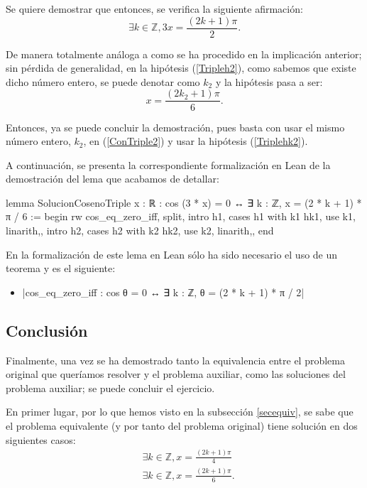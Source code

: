 \begin{demostracion}
  Se quiere demostrar que entonces, se verifica la siguiente
  afirmación:
  \begin{equation}\label{ConTriple2}
    ∃k∈ ℤ,3x=\frac{(2k+1)π}{2}.
  \end{equation}

  De manera totalmente análoga a como se ha procedido en la
  implicación anterior; sin pérdida de generalidad, en la
  hipótesis (\ref{Tripleh2}), como sabemos que existe dicho número
  entero, se puede denotar como \(k_2\) y la hipótesis pasa a ser:
  \begin{equation}\label{Triplehk2}\tag{hk2}
     x=\frac{(2k_2+1)π}{6}.
   \end{equation}

   Entonces, ya se puede concluir la demostración, pues basta con
   usar el mismo número entero, \(k_2\), en (\ref{ConTriple2}) y
   usar la hipótesis (\ref{Triplehk2}).
\end{demostracion}

A continuación, se presenta la correspondiente formalización
en Lean de la demostración del lema que acabamos de detallar:
\begin{leancode}
lemma SolucionCosenoTriple {x : ℝ} : cos (3 * x) = 0 ↔ 
∃ k : ℤ, x = (2 * k + 1) * π / 6 :=
begin
  rw cos_eq_zero_iff,
  split,
  {intro h1,
  cases h1 with k1 hk1,
  use k1,
  linarith,},
  {intro h2,
  cases h2 with k2 hk2,
  use k2,
  linarith,},
end
\end{leancode}

En la formalización de este lema en Lean sólo ha sido necesario
el uso de un teorema y es el siguiente:
\begin{itemize}
\item {}|cos_eq_zero_iff :  cos θ = 0 ↔ ∃ k : ℤ, θ = (2 * k + 1) * π / 2|
\end{itemize} 

\subsection{Conclusión}
Finalmente, una vez se ha demostrado tanto la equivalencia entre el
problema original que queríamos resolver y el problema auxiliar,
como las soluciones del problema auxiliar; se puede concluir el
ejercicio.

En primer lugar, por lo que hemos visto en la subsección
\ref{secequiv}, se sabe que el problema equivalente
(y por tanto del problema original) tiene solución en dos
siguientes casos:
\begin{align}
  &∃k∈ℤ, x=\frac{(2k+1)π}{4}\label{condicion1}\\
  &∃k∈ℤ, x=\frac{(2k+1)π}{6}.\label{condicion2}
\end{align}

